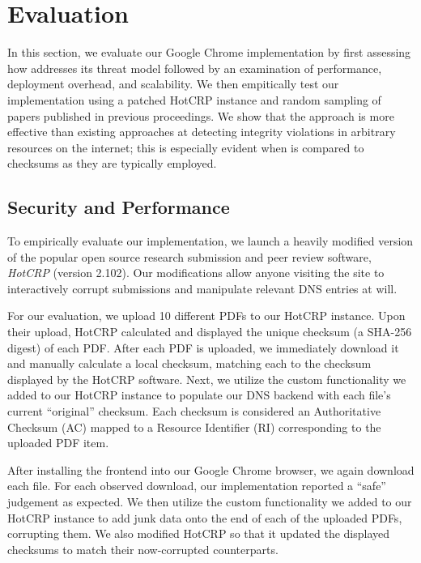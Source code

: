 \section{Evaluation} \label{sec:evaluation}

In this section, we evaluate our Google Chrome \SYSTEM{} implementation by first
assessing how \SYSTEM{} addresses its threat model followed by an examination of
performance, deployment overhead, and scalability. We then empitically test our
implementation using a patched HotCRP instance and random sampling of papers
published in previous \CONFERENCE{} proceedings. We show that the \SYSTEM{}
approach is more effective than existing approaches at detecting integrity
violations in arbitrary resources on the internet; this is especially evident
when \SYSTEM{} is compared to checksums as they are typically employed.

\subsection{Security and Performance}


To empirically evaluate our implementation, we launch a heavily modified version
of the popular open source research submission and peer review software,
\emph{HotCRP} (version 2.102). Our modifications allow anyone visiting the site
to interactively corrupt submissions and manipulate relevant DNS entries at
will.

For our evaluation, we upload 10 different \CONFERENCE{} PDFs to our HotCRP
instance. Upon their upload, HotCRP calculated and displayed the unique checksum
(a SHA-256 digest) of each PDF. After each PDF is uploaded, we immediately
download it and manually calculate a local checksum, matching each to the
checksum displayed by the HotCRP software. Next, we utilize the custom
functionality we added to our HotCRP instance to populate our DNS backend with
each file's current ``original'' checksum. Each checksum is considered an
Authoritative Checksum (AC) mapped to a Resource Identifier (RI) corresponding
to the uploaded PDF item.

After installing the frontend into our Google Chrome browser, we again download
each file. For each observed download, our implementation reported a ``safe''
judgement as expected. We then utilize the custom functionality we added to our
HotCRP instance to add junk data onto the end of each of the uploaded PDFs,
corrupting them. We also modified HotCRP so that it updated the displayed
checksums to match their now-corrupted counterparts.

